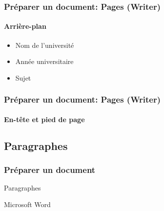 \documentclass[xcolor=table]{beamer}
\begin{document}
\begin{frame}[t]
\frametitle{Préparer un document: Pages (Writer)}
\framesubtitle{Arrière-plan}

\begin{minipage}{0.43\textwidth}
\begin{itemize}
\item Nom de l'université 
\item Année universitaire
\item Sujet
\end{itemize}
\end{minipage}
\begin{minipage}{0.55\textwidth}
\end{minipage}

\end{frame}


\begin{frame}
\frametitle{Préparer un document: Pages (Writer)}
\framesubtitle{En-tête et pied de page}

\end{frame}


\subsection{Paragraphes}

\begin{frame}
\frametitle{Préparer un document}

\begin{center}
	Paragraphes 
	
	Microsoft Word
\end{center}

\end{frame}
\end{document}
